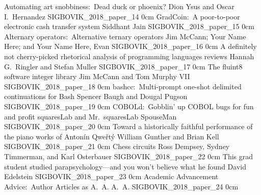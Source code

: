 \addpaper
	{Automating art snobbiness:\ Dead duck or phoenix?}
	{Dion Ysus and Oscar I.\ Hernandez}
	{}
	{SIGBOVIK_2018_paper_14}
	{0cm}
	{}
\addpaper
	{GradCoin:\ A poor-to-poor electronic cash transfer system}
	{Siddhant Jain}
	{}
	{SIGBOVIK_2018_paper_15}
	{0cm}
	{}
\addpaper
	{Alternary operators:\ Alternative ternary operators}
	{Jim McCann; Your Name Here; and Your Name Here, Evan}
	{}
	{SIGBOVIK_2018_paper_16}
	{0cm}
	{}
\addpaper
	{A definitely not cherry-picked rhetorical analysis of programming languages reviews}
	{Hannah G.\ Ringler and Stefan Muller}
	{}
	{SIGBOVIK_2018_paper_17}
	{0cm}
	{}
\addpaper
	{The fluint8 software integer library}
	{Jim McCann and Tom Murphy VII}
	{}
	{SIGBOVIK_2018_paper_18}
	{0cm}
	{}
\addpaper
	{bashcc:\ Multi-prompt one-shot delimited continuations for Bash}
	{Spencer Baugh and Dougal Pugson}
	{}
	{SIGBOVIK_2018_paper_19}
	{0cm}
	{}
\addpaper
	{COBOLd:\ Gobblin' up COBOL bugs for fun and profit}
	{squaresLab and Mr.\ squaresLab SpouseMan}
	{}
	{SIGBOVIK_2018_paper_20}
	{0cm}
	{}
\addpaper
	{Toward a historically faithful performance of the piano works of Anton\'in Qwe\v{r}t\'y}
	{William Gunther and Brian Kell}
	{}
	{SIGBOVIK_2018_paper_21}
	{0cm}
	{}
\addpaper
	{Chess circuits}
	{Ross Dempsey, Sydney Timmerman, and Karl Osterbauer}
	{}
	{SIGBOVIK_2018_paper_22}
	{0cm}
	{}
\addpaper
	{This grad student studied parapsychology---and you won't believe what he found}
	{David Edelstein}
	{}
	{SIGBOVIK_2018_paper_23}
	{0cm}
	{}
\addpaper
	{Academic Advancement Advice:\ Author Articles as A.\ A.}
	{A.\ A.}
	{}
	{SIGBOVIK_2018_paper_24}
	{0cm}
	{}
